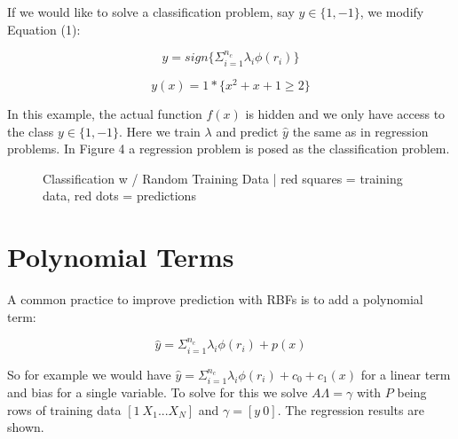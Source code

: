 \documentclass[12pt]{article}
\begin{document}
If we would like to solve a classification problem, say $y \in \{1,-1\}$, we modify Equation (1):

\begin{equation}
\hat{y}=sign\{\Sigma_{i=1}^{n_c} \lambda_i \phi(r_i)\}
\end{equation}

\begin{equation}
y(x) = 1 \ast \{x^2+x+1 \ge 2 \}
\end{equation}

In this example, the actual function $f(x)$ is hidden and we only have access to the class $y \in \{1,-1\}$. Here we train $\lambda$ and predict $\hat{y}$ the same as in regression problems. In Figure 4 a regression problem is posed as the classification problem.

\vspace{15mm}

\begin{figure}[h]
\centering
{}
\caption{Classification w / Random Training Data | red squares = training data, red dots = predictions}
\end{figure}

\section{Polynomial Terms}

A common practice to improve prediction with RBFs is to add a polynomial term:

\begin{equation}
\hat{y}=\Sigma_{i=1}^{n_c} \lambda_i \phi(r_i)+ p(x)
\end{equation}

So for example we would have $\hat{y}=\Sigma_{i=1}^{n_c} \lambda_i \phi(r_i)+c_0+c_1(x)$ for a linear term and bias for a single variable. To solve for this we solve $A\Lambda=\gamma$ with $P$ being rows of training data $[1\:X_1 ... X_N]$ and $\gamma=[y\:0]$. The regression results are shown.
\end{document}
